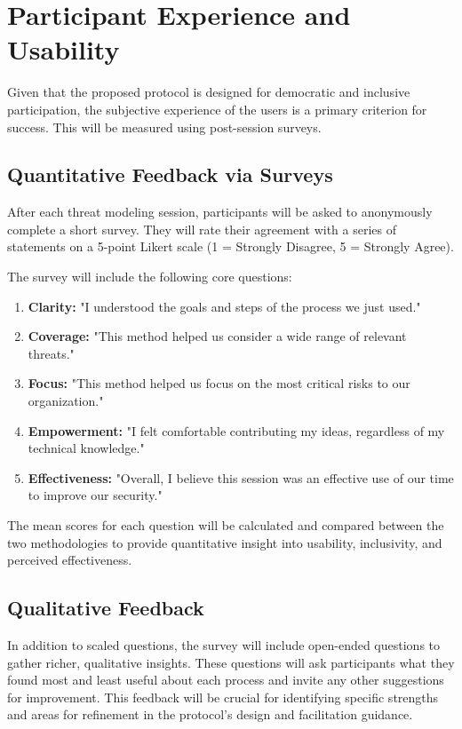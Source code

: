 \section{Participant Experience and Usability}
\label{sec:participant_experience}

Given that the proposed protocol is designed 
for democratic and inclusive
participation, the subjective experience of the users is a primary criterion for
success. This will be measured using post-session surveys.

\subsection{Quantitative Feedback via Surveys}
\label{subsec:quantitative_feedback}

After each threat modeling session, participants will be asked to anonymously
complete a short survey. They will rate their agreement with a series of
statements on a 5-point Likert scale (1 = Strongly Disagree, 5 = Strongly
Agree).

The survey will include the following core questions:

\begin{enumerate}
\item \textbf{Clarity:} "I understood the goals and steps of the process we just used."
\item \textbf{Coverage:} "This method helped us consider a wide range of relevant threats."
\item \textbf{Focus:} "This method helped us focus on the most critical risks to our organization."
\item \textbf{Empowerment:} "I felt comfortable contributing my ideas, regardless of my technical knowledge."
\item \textbf{Effectiveness:} "Overall, I believe this session was an effective use of our time to improve our security."
\end{enumerate}

The mean scores for each question will be calculated and compared between the
two methodologies to provide quantitative insight into usability, inclusivity,
and perceived effectiveness.

\subsection{Qualitative Feedback}
\label{subsec:qualitative_feedback}

In addition to scaled questions, the survey will include open-ended questions to
gather richer, qualitative insights. These questions will ask participants what
they found most and least useful about each process and invite any other
suggestions for improvement. This feedback will be crucial for identifying
specific strengths and areas for refinement in the protocol's design and
facilitation guidance.